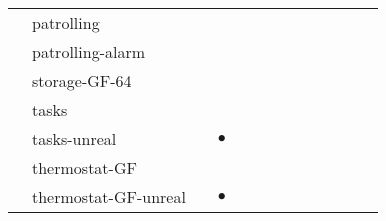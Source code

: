 \begin{tabular}{|c|lr|c||c|c|c||c|c|c|c||c|c|}
&  \textsf{patrolling} & \cite{DBLP:journals/pacmpl/HeimD25} &  &  &  &  &  &  &  &  &  &  \\
&  \textsf{patrolling-alarm} & \cite{DBLP:journals/pacmpl/HeimD25} &  &  &  &  &  &  &  &  &  &  \\
&  \textsf{storage-GF-64} & \cite{DBLP:journals/pacmpl/HeimD25} &  &  &  &  &  &  &  &  &  &  \\
&  \textsf{tasks} & \cite{DBLP:journals/pacmpl/HeimD25} &  &  &  &  &  &  &  &  &  &  \\
&  \textsf{tasks-unreal} & \cite{DBLP:journals/pacmpl/HeimD25} & $\bullet$ &  &  &  &  &  &  &  &  &  \\
&  \textsf{thermostat-GF} & \cite{DBLP:journals/pacmpl/HeimD25} &  &  &  &  &  &  &  &  &  &  \\
&  \textsf{thermostat-GF-unreal} & \cite{DBLP:journals/pacmpl/HeimD25} & $\bullet$ &  &  &  &  &  &  &  &  &  \\
\hline
\end{tabular}
